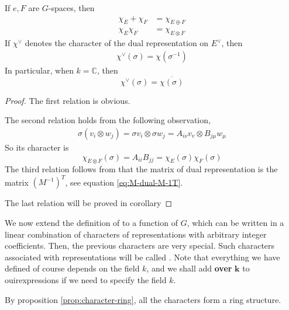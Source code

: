 \documentclass{article}
\begin{document}
\begin{prop}
    \label{prop:character-ring}
    If $e,F$ are $G$-spaces, then
    \begin{align}
        \chi_E +\chi_F &= \chi_{E\oplus F} \\
        \chi_E\chi_F   &= \chi_{E\otimes F}
    \end{align}
    If $\chi^\vee$ denotes the character of the dual representation on
    $E^\vee$, then
    \begin{align}
        \chi^\vee(\sigma) = \chi(\sigma^{-1})
    \end{align}
    In particular, when $k=\mathbb{C}$, then
    \begin{equation}
        \chi^\vee(\sigma) = \overline{\chi(\sigma)}
    \end{equation}
\end{prop}
\begin{proof}
    The first relation is obvious.

    The second relation holds from the following observation,
    \begin{align*}
        \sigma(v_i \otimes w_j) = \sigma v_i \otimes \sigma w_j =
        A_{i\nu} v_v \otimes B_{j\mu} w_\mu
    \end{align*}
    So its character is
    \begin{equation*}
        \chi_{E\otimes F}(\sigma) = A_{ii} B_{jj} =
        \chi_E(\sigma)\chi_F(\sigma)
    \end{equation*}
    The third relation follows from that the matrix of dual
    representation is the matrix $(M^{-1})^T$, see equation
    \ref{eq:M-dual-M-1T}.

    The last relation will be proved in corollary %
\end{proof}

We now extend the definition of  to a function of
$G$, which can be written in a linear combination of characters of
representations with arbitrary integer coefficients. Then, the
previous characters are very special. Such characters associated with
representations will be called . Note
that everything we have defined of course depends on the field $k$,
and we shall add \textbf{over} $\mathbf{k}$ to ouirexpressions if we
need to specify the field $k$.

\begin{remark}
    By proposition \ref{prop:character-ring}, all the characters form
    a ring structure.
\end{remark}
\end{document}
